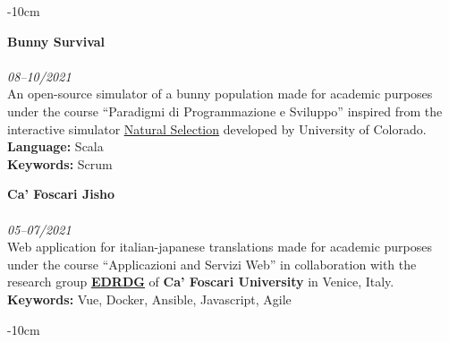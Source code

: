 \documentclass[10pt,a4paper]{altacv}
\begin{document}
\begin{adjustwidth}{}{-10cm}
    \divider

    \textbf{Bunny Survival}\\
    \\
    \textit{08--10/2021}\\ \smallskip
    An open-source simulator of a bunny population made for academic purposes under the course ``Paradigmi di Programmazione e Sviluppo'' inspired from the interactive simulator \href{https://phet.colorado.edu/en/simulations/natural-selection}{\underline{Natural Selection}} developed by University of Colorado.\\ \smallskip
    \textbf{Language:} Scala\\
    \textbf{Keywords:} Scrum

    \divider

    \textbf{\textbf{Ca' Foscari Jisho}}\\
    \\
    \textit{05--07/2021} \\ \smallskip
    Web application for italian-japanese translations made for academic purposes under the course ``Applicazioni and Servizi Web'' in collaboration with the research group \href{http://www.edrdg.org}{\underline{\textbf{EDRDG}}} of \textbf{Ca' Foscari University} in Venice, Italy.\\ \smallskip
    \textbf{Keywords:} Vue, Docker, Ansible, Javascript, Agile

\end{adjustwidth}

\begin{adjustwidth}{}{-10cm}


\end{adjustwidth}
\end{document}
